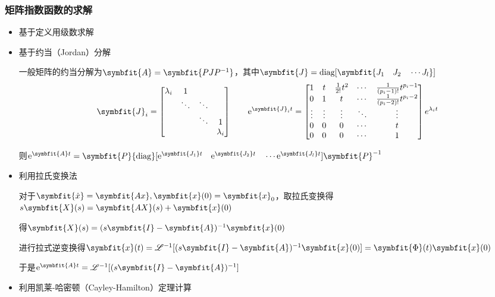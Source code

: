 \documentclass[11pt,a4paper]{ctexart}
\newcommand{\e}{{\rm e}}
\newcommand{\bm}{\symbfit}
\begin{document}
        \subsubsection{矩阵指数函数的求解}
            \begin{itemize}
            \item 基于定义用级数求解
            \item 基于约当（Jordan）分解
                
            一般矩阵的约当分解为$\bm{A}=\bm{PJP^{-1}}$，其中$\bm{J}={\rm diag}[\bm{J_1\quad J_2\quad\cdots J_l}]$
            \[
            \bm{J}_i=
            \begin{bmatrix}
            \lambda_i & 1 &  \\
                & \ddots & \ddots & \\
                &  & \ddots & 1  \\
                &  &  & \lambda_i\\
            \end{bmatrix}\qquad
            \e^{\bm{J}_i t}=\begin{bmatrix}
            1 & t & \frac{1}{2!}t^2 & \cdots & \frac{1}{(p_i-1)!}t^{p_i-1}\\
            0 & 1 & t & \cdots & \frac{1}{(p_i-2)!}t^{p_i-2}\\
            \vdots & \vdots & \vdots & \ddots & \vdots \\
            0 & 0 & 0 & \cdots & t\\
            0 & 0 & 0 & \cdots & 1\\
            \end{bmatrix}
            e^{\lambda_it}
            \]

            则$\e^{\bm{A}t}=\bm{P}{\rm diag}[\e^{\bm{J_1}t}\quad\e^{\bm{J_2}t}\quad\cdots\e^{\bm{J_l}t}]\bm{P}^{-1}$


            \item 利用拉氏变换法
                
            对于$\bm{\dot{x}}=\bm{Ax},\bm{x}(0)=\bm{x}_0$，取拉氏变换得$s\bm{X}(s)=\bm{AX}(s)+\bm{x}(0)$

            得$\bm{X}(s)=(s\bm{I}-\bm{A})^{-1}\bm{x}(0)$

            进行拉式逆变换得$\bm{x}(t)=\mathscr{L}^{-1}[(s\bm{I}-\bm{A})^{-1}\bm{x}(0)]=\bm{\Phi}(t)\bm{x}(0)$

            于是$\e^{\bm{A}t}=\mathscr{L}^{-1}[(s\bm{I}-\bm{A})^{-1}]$
            \item 利用凯莱-哈密顿（Cayley-Hamilton）定理计算
                

\end{itemize}
\end{document}
